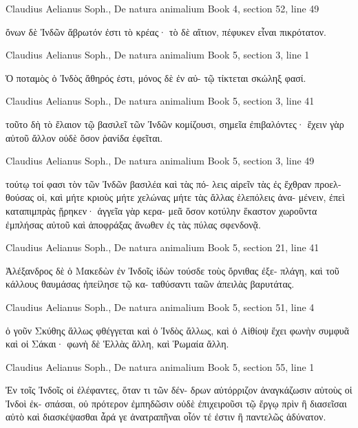 \documentclass[12pt,letterpaper,twoside,final]{memoir}
\begin{document}
\begin{greek}
Claudius Aelianus Soph., De natura animalium 
Book 4, section 52, line 49

                                     ὄνων δὲ Ἰνδῶν 
ἄβρωτόν ἐστι τὸ κρέας· τὸ δὲ αἴτιον, πέφυκεν εἶναι 
πικρότατον. 



Claudius Aelianus Soph., De natura animalium 
Book 5, section 3, line 1

Ὁ ποταμὸς ὁ Ἰνδὸς ἄθηρός ἐστι, μόνος δὲ ἐν αὐ-
τῷ τίκτεται σκώληξ φασί. 



Claudius Aelianus Soph., De natura animalium 
Book 5, section 3, line 41

                                τοῦτο δὴ τὸ ἔλαιον τῷ 
βασιλεῖ τῶν Ἰνδῶν κομίζουσι, σημεῖα ἐπιβαλόντες· 
ἔχειν γὰρ αὐτοῦ ἄλλον οὐδὲ ὅσον ῥανίδα ἐφεῖται. 



Claudius Aelianus Soph., De natura animalium 
Book 5, section 3, line 49

τούτῳ τοί φασι τὸν τῶν Ἰνδῶν βασιλέα καὶ τὰς πό-
λεις αἱρεῖν τὰς ἐς ἔχθραν προελθούσας οἱ, καὶ μήτε 
κριοὺς μήτε χελώνας μήτε τὰς ἄλλας ἑλεπόλεις ἀνα-
μένειν, ἐπεὶ καταπιμπρὰς ᾕρηκεν· ἀγγεῖα γὰρ κερα-
μεᾶ ὅσον κοτύλην ἕκαστον χωροῦντα ἐμπλήσας αὐτοῦ 
καὶ ἀποφράξας ἄνωθεν ἐς τὰς πύλας σφενδονᾷ. 



Claudius Aelianus Soph., De natura animalium 
Book 5, section 21, line 41

                                       Ἀλέξανδρος δὲ ὁ 
Μακεδὼν ἐν Ἰνδοῖς ἰδὼν τούσδε τοὺς ὄρνιθας ἐξε-
πλάγη, καὶ τοῦ κάλλους θαυμάσας ἠπείλησε τῷ κα-
ταθύσαντι ταῶν ἀπειλὰς βαρυτάτας. 



Claudius Aelianus Soph., De natura animalium 
Book 5, section 51, line 4

             ὁ γοῦν Σκύθης ἄλλως φθέγγεται καὶ 
ὁ Ἰνδὸς ἄλλως, καὶ ὁ Αἰθίοψ ἔχει φωνὴν συμφυᾶ 
καὶ οἱ Σάκαι· φωνὴ δὲ Ἑλλὰς ἄλλη, καὶ Ῥωμαία 
ἄλλη. 



Claudius Aelianus Soph., De natura animalium 
Book 5, section 55, line 1

Ἐν τοῖς Ἰνδοῖς οἱ ἐλέφαντες, ὅταν τι τῶν δέν-
δρων αὐτόρριζον ἀναγκάζωσιν αὐτοὺς οἱ Ἰνδοὶ ἐκ-
σπάσαι, οὐ πρότερον ἐμπηδῶσιν οὐδὲ ἐπιχειροῦσι τῷ 
ἔργῳ πρὶν ἢ διασεῖσαι αὐτὸ καὶ διασκέψασθαι ἆρά 
γε ἀνατραπῆναι οἷόν τέ ἐστιν ἢ παντελῶς ἀδύνατον. 




\end{greek}
\end{document}
